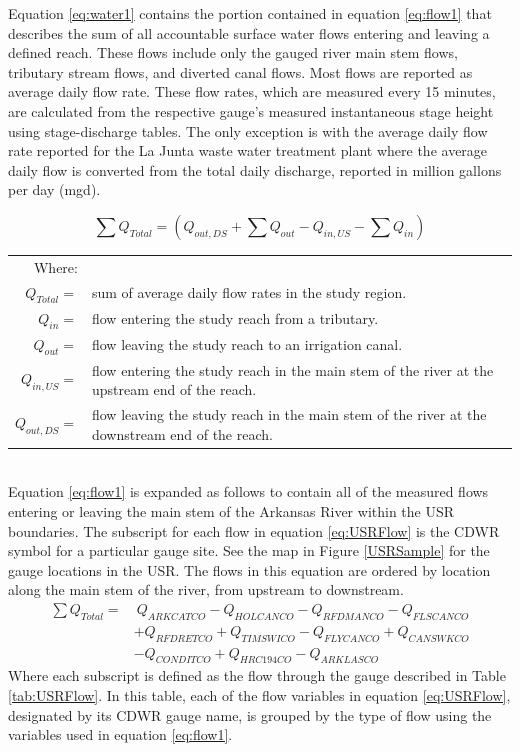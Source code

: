 \begin{linenumbers}
Equation \ref{eq:water1} contains the portion contained in equation \ref{eq:flow1} that describes the sum of all accountable surface water flows entering and leaving a defined reach.  These flows include only the gauged river main stem flows, tributary stream flows, and diverted canal flows.  Most flows are reported as average daily flow rate.  These flow rates, which are measured every 15 minutes, are calculated from the respective gauge's measured instantaneous stage height using stage-discharge tables.  The only exception is with the average daily flow rate reported for the La Junta waste water treatment plant where the average daily flow is converted from the total daily discharge, reported in million gallons per day (mgd).

\begin{equation}
\label{eq:flow1}
\sum Q_{Total} = \left( Q_{out,DS} + \sum Q_{out} - Q_{in,US} - \sum Q_{in} \right) 
\end{equation}
\begin{tabular}{r L{5.5in}}
	Where: & \\
	$ Q_{Total} = $ & sum of average daily flow rates in the study region.\\
	$ Q_{in} = $ & flow entering the study reach from a tributary.\\
	$ Q_{out} = $ & flow leaving the study reach to an irrigation canal.\\
	$ Q_{in,US} = $ & flow entering the study reach in the main stem of the river at the upstream end of the reach.\\
	$ Q_{out,DS} = $ & flow leaving the study reach in the main stem of the river at the downstream end of the reach.\\
\end{tabular}\\

Equation \ref{eq:flow1} is expanded as follows to contain all of the measured flows entering or leaving the main stem of the Arkansas River within the USR boundaries.  The subscript for each flow in equation \ref{eq:USRFlow} is the CDWR symbol for a particular gauge site.  See the map in Figure \ref{USRSample} for the gauge locations in the USR.  The flows in this equation are ordered by location along the main stem of the river, from upstream to downstream.
\begin{align}
	\label{eq:USRFlow}
	\sum Q_{Total} = &~Q_{ARKCATCO} - Q_{HOLCANCO} - Q_{RFDMANCO} - Q_{FLSCANCO} \\
	\nonumber & + Q_{RFDRETCO} + Q_{TIMSWICO} - Q_{FLYCANCO} + Q_{CANSWKCO} \\ 
	\nonumber & - Q_{CONDITCO} + Q_{HRC194CO} - Q_{ARKLASCO}
\end{align}
Where each subscript is defined as the flow through the gauge described in Table \ref{tab:USRFlow}.  In this table, each of the flow variables in equation \ref{eq:USRFlow}, designated by its CDWR gauge name, is grouped by the type of flow using the variables used in equation \ref{eq:flow1}.


\end{linenumbers}
